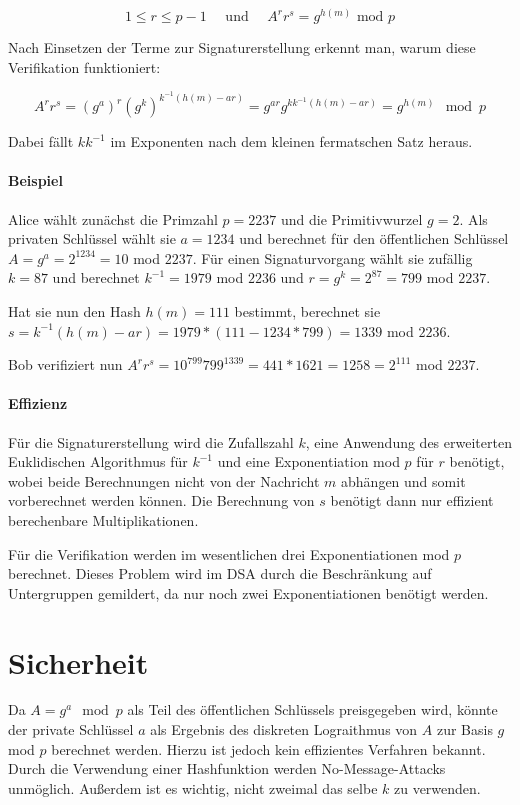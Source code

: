 \documentclass[a4paper,12pt,oneside]{scrreprt}
\begin{document}
\[ 1 \leq r \leq p-1 \text{~~~~und~~~~} A^r r^s = g^{h(m)} \text{ mod } p\]

Nach Einsetzen der Terme zur Signaturerstellung erkennt man, warum diese Verifikation funktioniert:

\[A^r r^s = (g^a)^r (g^k)^{k^{-1} (h(m)-ar)} = g^{ar} g^{k k^{-1} (h(m)-ar)} = g^{h(m)} \mod p \]

Dabei fällt $k k^{-1}$ im Exponenten nach dem kleinen fermatschen Satz heraus. 

\paragraph{Beispiel}

Alice wählt zunächst die Primzahl $p = 2237$ und die Primitivwurzel $g = 2$. Als privaten Schlüssel wählt sie $a = 1234$ und berechnet für den öffentlichen Schlüssel $A = g^a = 2^{1234} = 10$ mod $2237$. Für einen Signaturvorgang wählt sie zufällig $k = 87$ und berechnet $k^{-1} = 1979$ mod $2236$ und $r = g^k = 2^{87} = 799$ mod $2237$.

Hat sie nun den Hash $h(m) = 111$ bestimmt, berechnet sie $s = k^{-1}(h(m)-ar) = 1979*(111-1234*799) = 1339$ mod $2236$. 

Bob verifiziert nun $A^r r^s = 10^{799} 799^{1339} = 441 * 1621 = 1258 = 2^{111}$ mod $2237$. 

\paragraph{Effizienz}

Für die Signaturerstellung wird die Zufallszahl $k$, eine Anwendung des erweiterten Euklidischen Algorithmus für $k^{-1}$ und eine Exponentiation mod $p$ für $r$ benötigt, wobei beide Berechnungen nicht von der Nachricht $m$ abhängen und somit vorberechnet werden können. Die Berechnung von $s$ benötigt dann nur effizient berechenbare Multiplikationen. 

Für die Verifikation werden im wesentlichen drei Exponentiationen mod $p$ berechnet. Dieses Problem wird im DSA durch die Beschränkung auf Untergruppen gemildert, da nur noch zwei Exponentiationen benötigt werden. 

\section{Sicherheit}

Da $A = g^a \mod p$ als Teil des öffentlichen Schlüssels preisgegeben wird, könnte der private Schlüssel $a$ als Ergebnis des diskreten Lograithmus von $A$ zur Basis $g$ mod $p$ berechnet werden. Hierzu ist jedoch kein effizientes Verfahren bekannt. Durch die Verwendung einer Hashfunktion werden No-Message-Attacks unmöglich. Außerdem ist es wichtig, nicht zweimal das selbe $k$ zu verwenden. 
\end{document}
